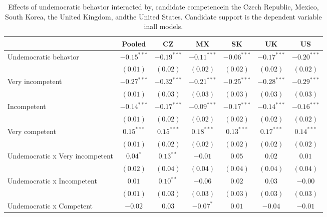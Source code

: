 
\begin{table}[!htbp]
\caption{Effects of undemocratic behavior interacted by, candidate competencein the Czech Republic, Mexico, South Korea, the United Kingdom, andthe United States. Candidate support is the dependent variable inall models.}
\begin{center}
\begin{tabular}{l c c c c c c}
\hline
 & Pooled & CZ & MX & SK & UK & US \\
\hline
Undemocratic behavior           & $-0.15^{***}$ & $-0.19^{***}$ & $-0.11^{***}$ & $-0.06^{***}$ & $-0.17^{***}$ & $-0.20^{***}$ \\
                                & $(0.01)$      & $(0.02)$      & $(0.02)$      & $(0.02)$      & $(0.02)$      & $(0.02)$      \\
Very incompetent                & $-0.27^{***}$ & $-0.32^{***}$ & $-0.21^{***}$ & $-0.25^{***}$ & $-0.28^{***}$ & $-0.29^{***}$ \\
                                & $(0.01)$      & $(0.03)$      & $(0.03)$      & $(0.03)$      & $(0.03)$      & $(0.03)$      \\
Incompetent                     & $-0.14^{***}$ & $-0.17^{***}$ & $-0.09^{***}$ & $-0.17^{***}$ & $-0.14^{***}$ & $-0.16^{***}$ \\
                                & $(0.01)$      & $(0.02)$      & $(0.02)$      & $(0.02)$      & $(0.02)$      & $(0.02)$      \\
Very competent                  & $0.15^{***}$  & $0.15^{***}$  & $0.18^{***}$  & $0.13^{***}$  & $0.17^{***}$  & $0.14^{***}$  \\
                                & $(0.01)$      & $(0.02)$      & $(0.02)$      & $(0.02)$      & $(0.02)$      & $(0.02)$      \\
Undemocratic x Very incompetent & $0.04^{*}$    & $0.13^{**}$   & $-0.01$       & $0.05$        & $0.02$        & $0.01$        \\
                                & $(0.02)$      & $(0.04)$      & $(0.04)$      & $(0.04)$      & $(0.04)$      & $(0.04)$      \\
Undemocratic x Incompetent      & $0.01$        & $0.10^{**}$   & $-0.06$       & $0.02$        & $0.03$        & $-0.00$       \\
                                & $(0.01)$      & $(0.03)$      & $(0.03)$      & $(0.03)$      & $(0.03)$      & $(0.03)$      \\
Undemocratic x Competent        & $-0.02$       & $0.03$        & $-0.07^{*}$   & $0.01$        & $-0.04$       & $-0.01$       \\

\end{tabular}
\end{center}
\end{table}

